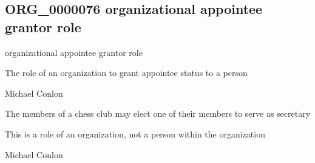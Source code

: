 \documentclass[letterpaper,10pt,english]{sphinxmanual}
\begin{document}
\subsection{ORG\_0000076 \sphinxhyphen{} organizational appointee grantor role}
\label{\detokenize{doc-ORG_0000076:org-0000076-organizational-appointee-grantor-role}}\label{\detokenize{doc-ORG_0000076:index-0}}\label{\detokenize{doc-ORG_0000076::doc}}
\begin{sphinxShadowBox}

\sphinxAtStartPar
organizational appointee grantor role
\end{sphinxShadowBox}

\begin{sphinxShadowBox}

\sphinxAtStartPar
{\hyperref[\detokenize{doc-BFO_0000023::doc}]{}}
\end{sphinxShadowBox}

\begin{sphinxShadowBox}

\sphinxAtStartPar
The role of an organization to grant appointee status to a person
\end{sphinxShadowBox}

\begin{sphinxShadowBox}

\sphinxAtStartPar
Michael Conlon 
\end{sphinxShadowBox}

\begin{sphinxShadowBox}

\sphinxAtStartPar
The members of a chess club may elect one of their members to serve as secretary
\end{sphinxShadowBox}

\begin{sphinxShadowBox}

\sphinxAtStartPar
This is a role of an organization, not a person within the organization
\end{sphinxShadowBox}

\begin{sphinxShadowBox}

\sphinxAtStartPar
Michael Conlon 
\end{sphinxShadowBox}
\begin{quote}

\ignorespaces \end{quote}
\end{document}
